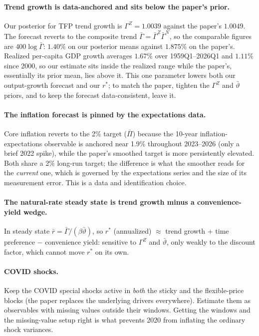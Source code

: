 \documentclass[11pt]{article}
\theoremstyle{definition}
\newcommand{\rstar}{r^{*}}
\begin{document}
\paragraph{Trend growth is data-anchored and sits below the paper's prior.}
Our posterior for TFP trend growth is $\Gamma^Z=1.0039$ against the paper's $1.0049$. The forecast
reverts to the composite trend $\bar\Gamma=\bar\Gamma^Z\bar\Gamma^N$, so the comparable figures are
$400\log\bar\Gamma$: $1.40\%$ on our posterior means against $1.875\%$ on the paper's. Realized
per-capita GDP growth averages $1.67\%$ over 1959Q1--2026Q1 and $1.11\%$ since 2000, so our estimate
sits inside the realized range while the paper's, essentially its prior mean, lies above it. This one
parameter lowers both our output-growth forecast and our $\rstar$; to match the paper, tighten the
$\Gamma^Z$ and $\bar\vartheta$ priors, and to keep the forecast data-consistent, leave it.

\paragraph{The inflation forecast is pinned by the expectations data.}
Core inflation reverts to the 2\% target ($\bar\Pi$) because the 10-year inflation-expectations
observable is anchored near 1.9\% throughout 2023--2026 (only a brief 2022 spike), while the paper's
smoothed target is more persistently elevated. Both share a 2\% long-run target; the difference is what
the smoother reads for the \emph{current} one, which is governed by the expectations series and the size
of its measurement error. This is a data and identification choice.

\paragraph{The natural-rate steady state is trend growth minus a convenience-yield wedge.}
In steady state $\bar r=\bar\Gamma/(\beta\bar\vartheta)$, so $\rstar$ (annualized) $\approx$ trend
growth $+$ time preference $-$ convenience yield: sensitive to $\Gamma^Z$ and $\bar\vartheta$, only
weakly to the discount factor, which cannot move $\rstar$ on its own.

\paragraph{COVID shocks.}
Keep the COVID special shocks active in \emph{both} the sticky and the flexible-price blocks (the paper
replaces the underlying drivers everywhere). Estimate them as observables with missing values outside
their windows. Getting the windows and the missing-value setup right is what prevents 2020 from
inflating the ordinary shock variances.
\end{document}
